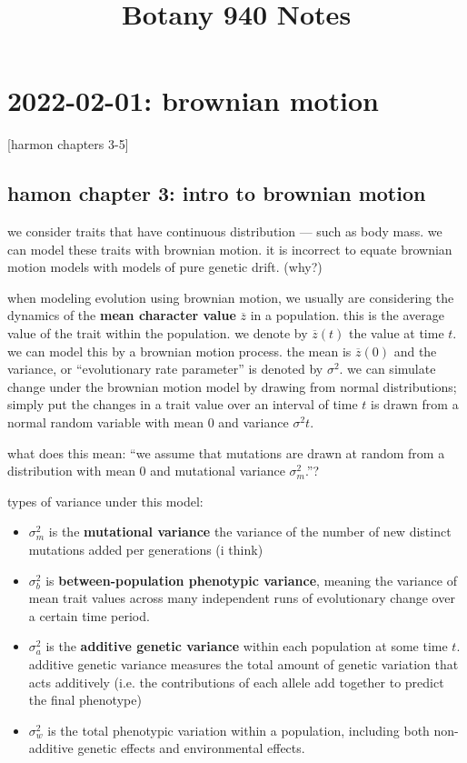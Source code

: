 \documentclass{article}
\title{Botany 940 Notes}
\newcommand{\advar}{\sigma_{a}^{2}} %
\newcommand{\bvar}{\sigma_{b}^{2}}  %
\newcommand{\mvar}{\sigma_{m}^{2}}  %
\newcommand{\wvar}{\sigma_{w}^{2}}  %
\begin{document}
\maketitle

\section{2022-02-01: brownian motion}
[harmon chapters 3-5]

\subsection{hamon chapter 3: intro to brownian motion}
we consider traits that have continuous distribution --- such as body mass. we
can model these traits with brownian motion. it is incorrect to equate brownian
motion models with models of pure genetic drift. (why?)

when modeling evolution using brownian motion, we usually are considering the
dynamics of the \textbf{mean character value} $\overline{z}$ in a population.
this is the average value of the trait within the population. we denote by
$\overline{z}(t)$ the value at time $t$. we can model this by a brownian motion
process. the mean is $\overline{z}(0)$ and the variance, or ``evolutionary rate
parameter'' is denoted by $\sigma^{2}$. we can simulate change under the
brownian motion model by drawing from normal distributions; simply put the
changes in a trait value over an interval of time $t$ is drawn from a normal
random variable with mean 0 and variance $\sigma^{2}t$.


what does this mean: ``we assume that mutations are drawn at random from a
distribution with mean 0 and mutational variance $\sigma_{m}^{2}$.''?
\begin{definition}
types of variance under this model:
\begin{itemize}
  \item $\mvar$ is the \textbf{mutational variance} the variance of the number of
    new distinct mutations added per generations (i think)
  \item $\bvar$ is \textbf{between-population phenotypic variance}, meaning the
    variance of mean trait values across many independent runs of evolutionary
    change over a certain time period.
  \item $\advar$ is the \textbf{additive genetic variance} within each
    population at some time $t$. additive genetic variance measures the total
    amount of genetic variation that acts additively (i.e. the contributions of
    each allele add together to predict the final phenotype)
  \item $\wvar$ is the total phenotypic variation within a population, including
    both non-additive genetic effects and environmental effects.
\end{itemize}
\end{definition}
\end{document}
